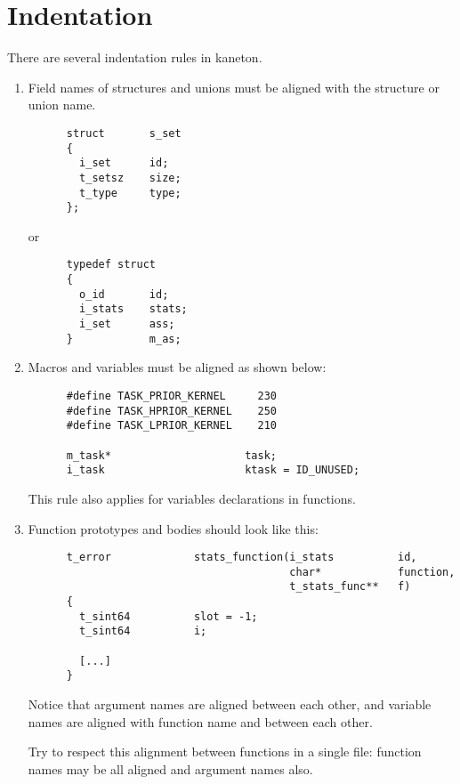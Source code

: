 %
%

\section{Indentation}

There are several indentation rules in kaneton.

\begin{enumerate}
  \item
    Field names of structures and unions must be aligned with the
    structure or union name.

    \begin{verbatim}
      struct       s_set
      {
        i_set      id;
        t_setsz    size;
        t_type     type;
      };
    \end{verbatim}

    or

    \begin{verbatim}
      typedef struct
      {
        o_id       id;
        i_stats    stats;
        i_set      ass;
      }            m_as;
    \end{verbatim}
  \item
    Macros and variables must be aligned as shown below:

    \begin{verbatim}
      #define TASK_PRIOR_KERNEL     230
      #define TASK_HPRIOR_KERNEL    250
      #define TASK_LPRIOR_KERNEL    210

      m_task*                     task;
      i_task                      ktask = ID_UNUSED;
    \end{verbatim}

    This rule also applies for variables declarations in functions.
  \item
    Function prototypes and bodies should look like this:

    \begin{verbatim}
      t_error             stats_function(i_stats          id,
                                         char*            function,
                                         t_stats_func**   f)
      {
        t_sint64          slot = -1;
        t_sint64          i;

        [...]
      }
    \end{verbatim}

    Notice that argument names are aligned between each other,
    and variable names are aligned with function name and between
    each other.

    Try to respect this alignment between functions in a single file:
    function names may be all aligned and argument names also.
\end{enumerate}

